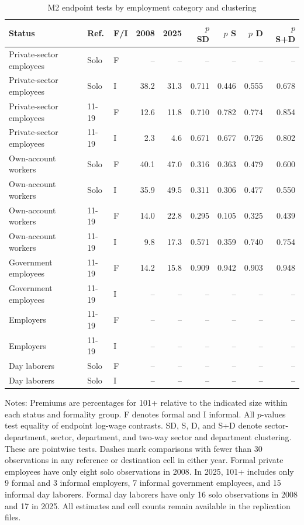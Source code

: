 \begin{table}[htbp]
\centering\small
\caption{M2 endpoint tests by employment category and clustering}
\label{tab:status-endpoint-clustering}
\begin{tabular}{>{\raggedright\arraybackslash}p{}llrrrrrr}
\toprule
Status & Ref. & F/I & 2008 & 2025 & $p$ SD & $p$ S & $p$ D & $p$ S+D \\
\midrule
Private-sector employees & Solo & F & -- & -- & -- & -- & -- & -- \\
Private-sector employees & Solo & I & 38.2 & 31.3 & 0.711 & 0.446 & 0.555 & 0.678 \\
Private-sector employees & 11-19 & F & 12.6 & 11.8 & 0.710 & 0.782 & 0.774 & 0.854 \\
Private-sector employees & 11-19 & I & 2.3 & 4.6 & 0.671 & 0.677 & 0.726 & 0.802 \\
Own-account workers & Solo & F & 40.1 & 47.0 & 0.316 & 0.363 & 0.479 & 0.600 \\
Own-account workers & Solo & I & 35.9 & 49.5 & 0.311 & 0.306 & 0.477 & 0.550 \\
Own-account workers & 11-19 & F & 14.0 & 22.8 & 0.295 & 0.105 & 0.325 & 0.439 \\
Own-account workers & 11-19 & I & 9.8 & 17.3 & 0.571 & 0.359 & 0.740 & 0.754 \\
Government employees & 11-19 & F & 14.2 & 15.8 & 0.909 & 0.942 & 0.903 & 0.948 \\
Government employees & 11-19 & I & -- & -- & -- & -- & -- & -- \\
Employers & 11-19 & F & -- & -- & -- & -- & -- & -- \\
Employers & 11-19 & I & -- & -- & -- & -- & -- & -- \\
Day laborers & Solo & F & -- & -- & -- & -- & -- & -- \\
Day laborers & Solo & I & -- & -- & -- & -- & -- & -- \\
\bottomrule
\end{tabular}
\par\vspace{0.3em}
\begin{minipage}{0.97\textwidth}\footnotesize
Notes: Premiums are percentages for 101+ relative to the indicated size within each status and formality group. F denotes formal and I informal. All $p$-values test equality of endpoint log-wage contrasts. SD, S, D, and S+D denote sector-department, sector, department, and two-way sector and department clustering. These are pointwise tests. Dashes mark comparisons with fewer than 30 observations in any reference or destination cell in either year. Formal private employees have only eight solo observations in 2008. In 2025, 101+ includes only 9 formal and 3 informal employers, 7 informal government employees, and 15 informal day laborers. Formal day laborers have only 16 solo observations in 2008 and 17 in 2025. All estimates and cell counts remain available in the replication files.
\end{minipage}
\end{table}
